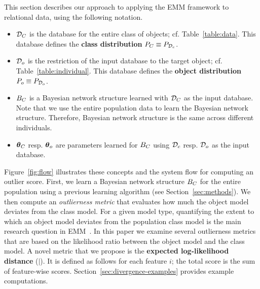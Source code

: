 {This section describes our approach to applying the EMM framework to relational data, using the following notation.
%
\begin{itemize}
	\item $\mathcal{D}_{C}$ is the database for the entire class of objects; cf. Table~\ref{table:data}. This database defines the \textbf{class distribution} $P_{C} \equiv P_{\mathcal{D}_{c}}$.
	\item $\mathcal{D}_{o}$ is the restriction of the input database to the target object; cf. Table~\ref{table:individual}. This database defines the \textbf{object distribution} $P_{o} \equiv P_{\mathcal{D}_{o}}$.
	\item $B_{C}$ is a Bayesian network structure learned with $\mathcal{D}_{C}$ as the input database. Note that we use the entire population data to learn the Bayesian network structure. Therefore, Bayesian network structure is the same across different individuals.
	\item $\boldsymbol{\theta}_{C}$ resp. $\boldsymbol{\theta}_{o}$ are parameters learned for $B_{C}$ using $\mathcal{D}_{c}$ resp. $\mathcal{D}_{o}$ as the input database.
\end{itemize}

Figure~\ref{fig:flow} illustrates these concepts and the system flow for computing an outlier score. First, we learn a Bayesian network structure $B_{C}$ for the entire population using a previous learning algorithm (see Section~\ref{sec:methods}). We then compute an {\em outlierness metric} that evaluates how much the object model deviates from the class model. 
%
%
For a given model type, quantifying the extent to which an object model deviates from the population class model is the main research question in EMM~\cite{Duivesteijn2016}. In this paper we examine several outlierness metrics that are based on the likelihood ratio between the object model and the class model. 
A novel metric that we propose is the \textbf{expected log-likelihood distance} ($\mid$). It is defined as follows for each feature $i$; the total score is the sum of feature-wise scores. Section~\ref{sec:divergence-examples}  provides example computations.


}
